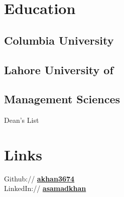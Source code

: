 \documentclass[letterpaper]{deedy-resume} %
\begin{document}
\begin{minipage}[t]{0.33\textwidth} %


\section{Education} 

\subsection{Columbia University}


\sectionspace %


\subsection{Lahore University of }
\subsection{Management Sciences}

Dean's List \\

\sectionspace %


\section{Links} 

Github:// \href{https://github.com/akhan3674}{\bf akhan3674} \\
LinkedIn:// \href{https://www.linkedin.com/in/asamadkhan}{\bf asamadkhan} \\


\end{minipage}
\end{document}
